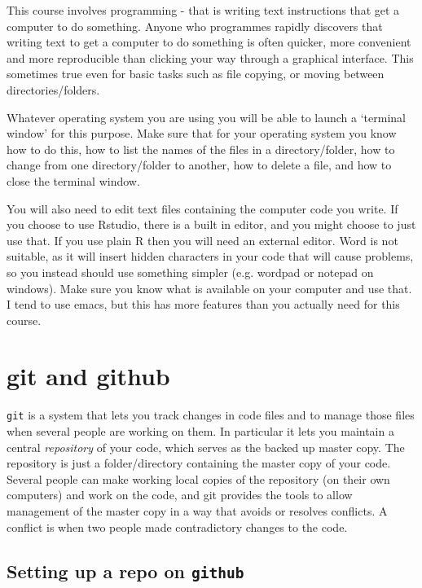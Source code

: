 \documentclass[10pt] {article}
\theoremstyle{definition}
\begin{document}
This course involves programming - that is writing text instructions that get a computer to do something. Anyone who programmes rapidly discovers that writing text to get a computer to do something is often quicker, more convenient and more reproducible than clicking your way through a graphical interface. This sometimes true even for basic tasks such as file copying, or moving between directories/folders. 

Whatever operating system you are using you will be able to launch a `terminal window' for this purpose. Make sure that for your operating system you know how to do this, how to list the names of the files in a directory/folder, how to change from one directory/folder to another, how to delete a file, and how to close the terminal window. 

You will also need to edit text files containing the computer code you write. If you choose to use Rstudio, there is a built in editor, and you might choose to just use that. If you use plain R then you will need an external editor. Word is not suitable, as it will insert hidden characters in your code that will cause problems, so you instead should use something simpler (e.g. wordpad or notepad on windows). Make sure you know what is available on your computer and use that. I tend to use emacs, but this has more features than you actually need for this course. 

\section{git and github}

{\tt git} is a system that lets you track changes in code files and to manage those files when several people are working on them. In particular it lets you maintain a central {\em repository} of your code, which serves as the backed up master copy. The repository is just a folder/directory containing the master copy of your code. Several people can make working local copies of the repository (on their own computers) and work on the code, and git provides the tools to allow management of the master copy in a way that avoids or resolves conflicts. A conflict is when two people made contradictory changes to the code. 

\subsection{Setting up a repo on {\tt github}}
\end{document}
